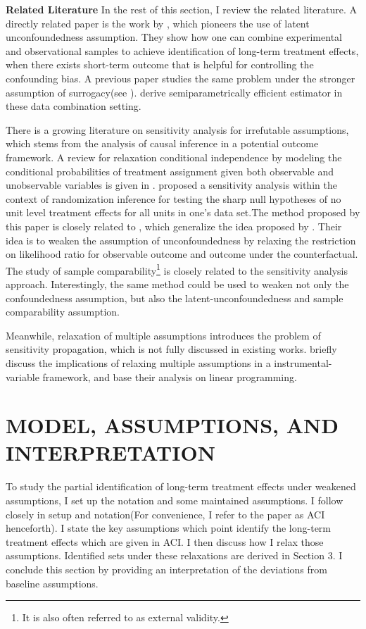 \documentclass[12pt]{article}
\begin{document}
	\medskip
	\textbf{Related Literature} In the rest of this section, I review the related literature. A directly related paper is the work by \textcite{athey2020combining}, which pioneers the use of latent unconfoundedness assumption. They show how one can combine experimental and observational samples to achieve identification of long-term treatment effects, when there exists short-term outcome that is helpful for controlling the confounding bias. A previous paper studies the same problem under the stronger assumption of surrogacy(see \textcite{athey2019surrogate}). \textcite{chen2021semiparametric} derive semiparametrically efficient estimator in these data combination setting. 

    There is a growing literature on sensitivity analysis for irrefutable assumptions, which stems from the analysis of causal inference in a potential outcome framework. A review for relaxation conditional independence by modeling the conditional probabilities of treatment assignment given both observable and unobservable variables is given in \textcite{masten2018identification}. \textcite{rosenbaum2002overt} proposed a sensitivity analysis within the context of randomization inference for testing the sharp null hypotheses of no unit level treatment effects for all units in one’s data set.The method proposed by this paper is closely related to \textcite{yadlowsky2018bounds}, which generalize the idea proposed by \textcite{rosenbaum2002overt}. Their idea is to weaken the assumption of unconfoundedness by relaxing the restriction on likelihood ratio for observable outcome and outcome under the counterfactual. The study of sample comparability\footnote{It is also often referred to as external validity.} is closely related to the sensitivity analysis approach. 
    Interestingly, the same method could be used to weaken not only the confoundedness assumption, but also the latent-unconfoundedness and sample comparability assumption. 

    Meanwhile, relaxation of multiple assumptions introduces the problem of sensitivity propagation, which is not fully discussed in existing works. \textcite{masten2021salvaging} briefly discuss the implications of relaxing multiple assumptions in a instrumental-variable framework, and base their analysis on linear programming. 

	\section{MODEL, ASSUMPTIONS, AND INTERPRETATION}
    To study the partial identification of long-term treatment effects under weakened assumptions, I set up the notation and some maintained assumptions. I follow \textcite{athey2020combining} closely in setup and notation(For convenience, I refer to the paper as ACI henceforth). I state the key assumptions which point identify the long-term treatment effects which are given in ACI. I then discuss how I relax those assumptions. Identified sets under these relaxations are derived in Section 3. I conclude this section by providing an interpretation of the deviations from baseline assumptions.
	
\end{document}

